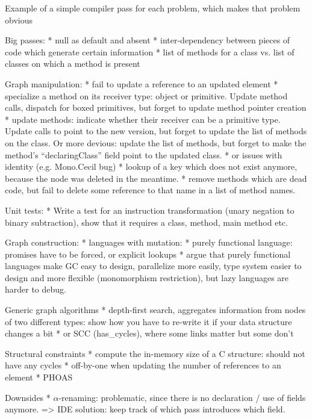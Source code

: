 Example of a simple compiler pass for each problem, which makes that problem obvious

Big passes:
* null as default and absent
* inter-dependency between pieces of code which generate certain information
  * list of methods for a class vs. list of classes on which a method is present

Graph manipulation:
* fail to update a reference to an updated element
  * specialize a method on its receiver type: object or primitive. Update method calls, dispatch for boxed primitives, but forget to update method pointer creation
  * update methods: indicate whether their receiver can be a primitive type. Update calls to point to the new version, but forget to update the list of methods on the class. Or more devious: update the list of methods, but forget to make the method's ``declaringClass'' field point to the updated class.
* or issues with identity (e.g. Mono.Cecil bug)
* lookup of a key which does not exist anymore, because the node was deleted in the meantime.
  * remove methods which are dead code, but fail to delete some reference to that name in a list of method names.

Unit tests:
* Write a test for an instruction transformation (unary negation to binary subtraction), show that it requires a class, method, main method etc.

Graph construction:
* languages with mutation: 
* purely functional language: promises have to be forced, or explicit lookups
* argue that purely functional languages make GC easy to design, parallelize more easily, type system easier to design and more flexible (monomorphism restriction), but lazy languages are harder to debug.

Generic graph algorithms
* depth-first search, aggregates information from nodes of two different types: show how you have to re-write it if your data structure changes a bit
* or SCC (has_cycles), where some links matter but some don't

Structural constraints
* compute the in-memory size of a C structure: should not have any cycles
* off-by-one when updating the number of references to an element
* PHOAS



Downsides
* $\alpha$-renaming: problematic, since there is no declaration / use of fields anymore.
=> IDE solution: keep track of which pass introduces which field.